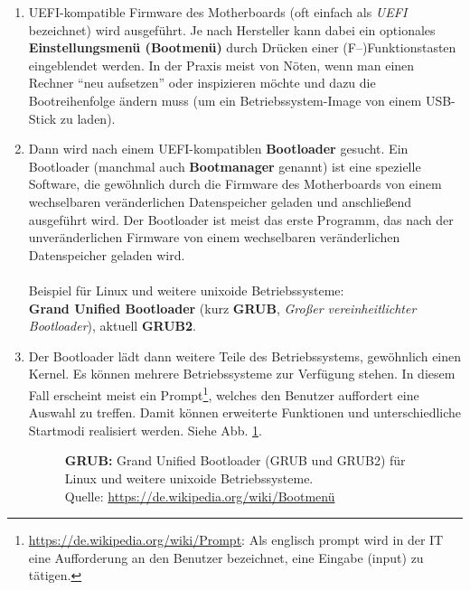 \begin{enumerate}
	\item UEFI-kompatible Firmware des Motherboards (oft einfach als \textit{UEFI} bezeichnet) wird ausgeführt. Je nach Hersteller kann dabei ein optionales \textbf{Einstellungsmenü (\textbf{Bootmenü})} durch Drücken einer (F--)Funktionstasten eingeblendet werden. In der Praxis meist von Nöten, wenn man einen Rechner ``neu aufsetzen'' oder inspizieren möchte und dazu die Bootreihenfolge ändern muss (um ein Betriebssystem-Image von einem USB-Stick zu laden).
	\item Dann wird nach einem UEFI-kompatiblen \textbf{Bootloader} gesucht. Ein Bootloader (manchmal auch \textbf{Bootmanager} genannt) ist eine spezielle Software, die gewöhnlich durch die Firmware des Motherboards von einem wechselbaren veränderlichen Datenspeicher geladen und anschließend ausgeführt wird. Der Bootloader ist meist das erste Programm, das nach der unveränderlichen Firmware von einem wechselbaren veränderlichen Datenspeicher geladen wird.\\~\\
	Beispiel für Linux und weitere unixoide Betriebssysteme:\\ \textbf{Grand Unified Bootloader} (kurz \textbf{GRUB}, \textit{Großer vereinheitlichter Bootloader}), aktuell \textbf{GRUB2}.
\item Der Bootloader lädt dann weitere Teile des Betriebssystems, gewöhnlich einen Kernel. Es können mehrere Betriebssysteme zur Verfügung stehen. In diesem Fall erscheint meist ein Prompt\footnote{\hyperref{https://de.wikipedia.org/wiki/Prompt}{}{}{https://de.wikipedia.org/wiki/Prompt}: Als englisch prompt wird in der IT eine Aufforderung an den Benutzer bezeichnet, eine Eingabe (input) zu tätigen.}, welches den Benutzer auffordert eine Auswahl zu treffen. Damit können erweiterte Funktionen und unterschiedliche Startmodi realisiert werden. Siehe Abb. \ref{fig:bootloadergrub}.
\begin{figure}[h!]
	\centering
	\caption[\textbf{GRUB} Linux Bootloader]{\textbf{GRUB:} Grand Unified Bootloader (GRUB und GRUB2) für Linux und weitere unixoide Betriebssysteme.\\ Quelle: \url{https://de.wikipedia.org/wiki/Bootmenü}}
	\label{fig:bootloadergrub}
\end{figure}
\end{enumerate}
\clearpage
